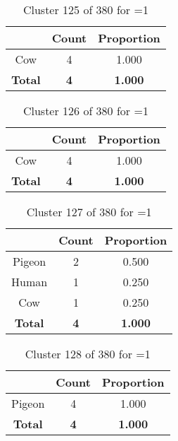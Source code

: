 \begin{table}[ht!]
\centering
\begin{tabular}{|c|c|c|}
\hline
\bf \Spec{} &\bf Count &\bf Proportion\\ \hline \hline
Cow & 4 & 1.000\\ \hline
\hline
\bf Total & \bf 4 & \bf 1.000\\ \hline
\end{tabular}
\label{tab:cluster:125:1}
\caption{Cluster 125 of 380 for \minneigh{}=1}
\end{table}

\begin{table}[ht!]
\centering
\begin{tabular}{|c|c|c|}
\hline
\bf \Spec{} &\bf Count &\bf Proportion\\ \hline \hline
Cow & 4 & 1.000\\ \hline
\hline
\bf Total & \bf 4 & \bf 1.000\\ \hline
\end{tabular}
\label{tab:cluster:126:1}
\caption{Cluster 126 of 380 for \minneigh{}=1}
\end{table}

\begin{table}[ht!]
\centering
\begin{tabular}{|c|c|c|}
\hline
\bf \Spec{} &\bf Count &\bf Proportion\\ \hline \hline
Pigeon & 2 & 0.500\\ \hline
Human & 1 & 0.250\\ \hline
Cow & 1 & 0.250\\ \hline
\hline
\bf Total & \bf 4 & \bf 1.000\\ \hline
\end{tabular}
\label{tab:cluster:127:1}
\caption{Cluster 127 of 380 for \minneigh{}=1}
\end{table}

\begin{table}[ht!]
\centering
\begin{tabular}{|c|c|c|}
\hline
\bf \Spec{} &\bf Count &\bf Proportion\\ \hline \hline
Pigeon & 4 & 1.000\\ \hline
\hline
\bf Total & \bf 4 & \bf 1.000\\ \hline
\end{tabular}
\label{tab:cluster:128:1}
\caption{Cluster 128 of 380 for \minneigh{}=1}
\end{table}

